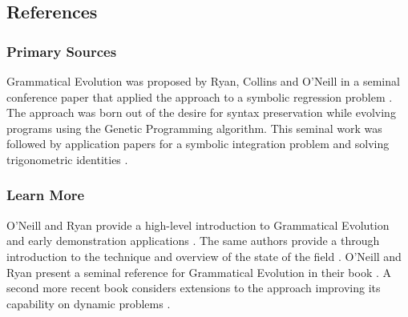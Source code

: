 


\subsection{References}

% 
% 
\subsubsection{Primary Sources}
Grammatical Evolution was proposed by Ryan, Collins and O'Neill in a seminal conference paper that applied the approach to a symbolic regression problem \cite{Ryan1998a}. 
The approach was born out of the desire for syntax preservation while evolving programs using the Genetic Programming algorithm.
This seminal work was followed by application papers for a symbolic integration problem \cite{O'Neill1998, O'Neill1998a} and solving trigonometric identities \cite{Ryan1998}.

% 
% 
\subsubsection{Learn More}
O'Neill and Ryan provide a high-level introduction to Grammatical Evolution and early demonstration applications \cite{O'Neill1999}. The same authors provide a through introduction to the technique and overview of the state of the field \cite{O'Neill2001}.
O'Neill and Ryan present a seminal reference for Grammatical Evolution in their book \cite{O'Neill2003}. A second more recent book considers extensions to the approach improving its capability on dynamic problems \cite{Dempsey2009}.
